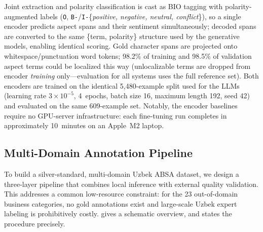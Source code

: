 \documentclass[bdcc,article,submit,moreauthors]{Definitions/mdpi}
\begin{document}
Joint extraction and polarity classification is cast as BIO tagging with polarity-augmented labels (\texttt{O}, \texttt{B-}/\texttt{I-}\{\textit{positive, negative, neutral, conflict}\}), so a single encoder predicts aspect spans and their sentiment simultaneously; decoded spans are converted to the same \{term, polarity\} structure used by the generative models, enabling identical scoring. Gold character spans are projected onto whitespace/punctuation word tokens; 98.2\% of training and 98.5\% of validation aspect terms could be localized this way (unlocalizable terms are dropped from encoder \emph{training} only---evaluation for all systems uses the full reference set). Both encoders are trained on the identical 5{,}480-example split used for the LLMs (learning rate $3{\times}10^{-5}$, 4~epochs, batch size 16, maximum length 192, seed 42) and evaluated on the same 609-example set. Notably, the encoder baselines require no GPU-server infrastructure: each fine-tuning run completes in approximately 10~minutes on an Apple~M2 laptop.
\subsection{Multi-Domain Annotation Pipeline}
\label{sec:meth_pipeline}

To build a silver-standard, multi-domain Uzbek ABSA dataset, we design a three-layer pipeline that combines local inference with external quality validation. This addresses a common low-resource constraint: for the 23 out-of-domain business categories, no gold annotations exist and large-scale Uzbek expert labeling is prohibitively costly.  gives a schematic overview, and  states the procedure precisely.
\end{document}
